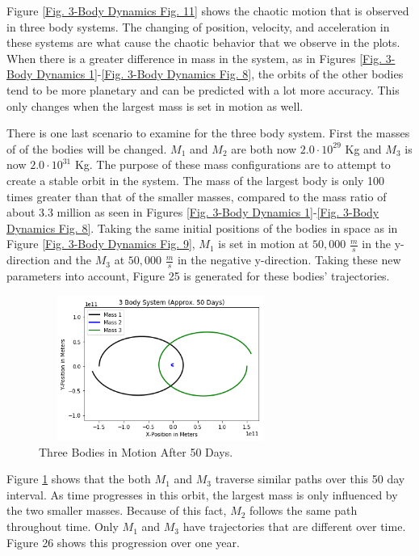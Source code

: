 \documentclass[twocolumn]{article}
\begin{document}
\par \noindent
Figure \ref{Fig. 3-Body Dynamics Fig. 11} shows the chaotic motion that is observed in three body systems. The changing of position, velocity, and acceleration in these systems are what cause the chaotic behavior that we observe in the plots. When there is a greater difference in mass in the system, as in Figures \ref{Fig. 3-Body Dynamics 1}-\ref{Fig. 3-Body Dynamics Fig. 8}, the orbits of the other bodies tend to be more planetary and can be predicted with a lot more accuracy. This only changes when the largest mass is set in motion as well. 

There is one last scenario to examine for the three body system. First the masses of of the bodies will be changed. $M_1$ and $M_2$ are both now $2.0\cdot10^{29}$ Kg and $M_3$ is now $2.0\cdot10^{31}$ Kg. The purpose of these mass configurations are to attempt to create a stable orbit in the system. The mass of the largest body is only 100 times greater than that of the smaller masses, compared to the mass ratio of about 3.3 million as seen in Figures \ref{Fig. 3-Body Dynamics 1}-\ref{Fig. 3-Body Dynamics Fig. 8}. Taking the same initial positions of the bodies in space as in Figure \ref{Fig. 3-Body Dynamics Fig. 9}, $M_1$ is set in motion at $50,000$ $\frac{m}{s}$ in the y-direction and the $M_3$ at $50,000$ $\frac{m}{s}$ in the negative y-direction. Taking these new parameters into account, Figure 25 is generated for these bodies' trajectories.
\newpage
\begin{figure}[h]
    \centering
    \includegraphics[width=8cm, height=4.75cm]{Figures/3-Body Dynamics (12).png}
    \caption{\small{Three Bodies in Motion After 50 Days.}}
    \label{Fig. 3-Body Dynamics Fig. 12}
\end{figure}
\par \noindent
Figure \ref{Fig. 3-Body Dynamics Fig. 12} shows that the both $M_1$ and $M_3$ traverse similar paths over this 50 day interval. As time progresses in this orbit, the largest mass is only influenced by the two smaller masses. Because of this fact, $M_2$ follows the same path throughout time. Only $M_1$ and $M_3$ have trajectories that are different over time. Figure 26 shows this progression over one year.
\end{document}
